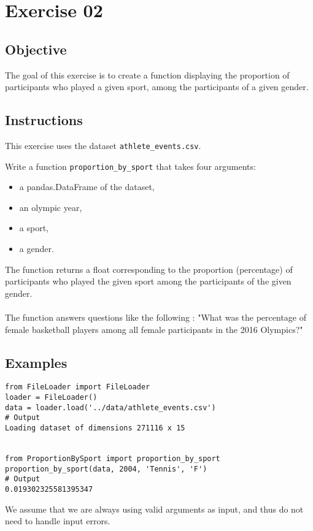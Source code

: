 \chapter{Exercise 02}
\makeheaderfilesforbidden

\section*{Objective}
The goal of this exercise is to create a function displaying
the proportion of participants who played a given sport, among
the participants of a given gender.

\section*{Instructions}
This exercise uses the dataset \texttt{athlete\_events.csv}.

Write a function \texttt{proportion\_by\_sport} that takes four arguments:
\begin{itemize}
  \item a pandas.DataFrame of the dataset,
  \item an olympic year,
  \item a sport,
  \item a gender.
\end{itemize}
The function returns a float corresponding to the proportion (percentage) of participants 
who played the given sport among the participants of the given gender.\\
\\
The function answers questions like the following : 
"What was the percentage of female basketball players among all female 
participants in the 2016 Olympics?"


\section*{Examples}
\begin{verbatim}
from FileLoader import FileLoader
loader = FileLoader()
data = loader.load('../data/athlete_events.csv')
# Output
Loading dataset of dimensions 271116 x 15


from ProportionBySport import proportion_by_sport
proportion_by_sport(data, 2004, 'Tennis', 'F')
# Output
0.019302325581395347
\end{verbatim}
\newline
We assume that we are always using valid arguments as input,
and thus do not need to handle input errors.